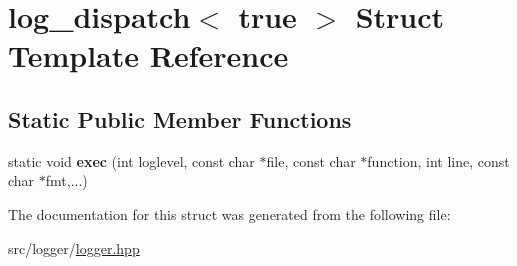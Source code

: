 \hypertarget{structlog__dispatch_3_01true_01_4}{\section{log\-\_\-dispatch$<$ true $>$ Struct Template Reference}
\label{structlog__dispatch_3_01true_01_4}
}
\subsection*{Static Public Member Functions}
\begin{DoxyCompactItemize}
\item 
\hypertarget{structlog__dispatch_3_01true_01_4_ab4d01f08f0a56986ab6d938865c1c9f5}{static void {\bfseries exec} (int loglevel, const char $\ast$file, const char $\ast$function, int line, const char $\ast$fmt,...)}\label{structlog__dispatch_3_01true_01_4_ab4d01f08f0a56986ab6d938865c1c9f5}

\end{DoxyCompactItemize}


The documentation for this struct was generated from the following file\-:\begin{DoxyCompactItemize}
\item 
src/logger/\hyperlink{logger_8hpp}{logger.\-hpp}\end{DoxyCompactItemize}
